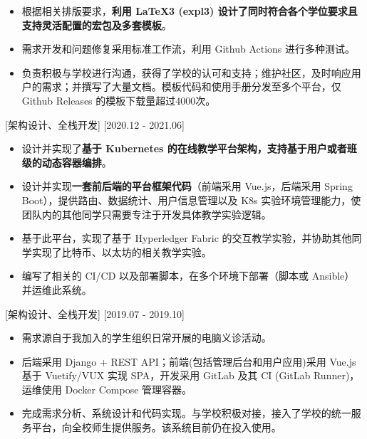 \documentclass{resume}
\begin{document}
\begin{itemize}
  \item 根据相关排版要求，\textbf{利用 LaTeX3 (expl3) 设计了同时符合各个学位要求且支持灵活配置的宏包及多套模板}。
  \item 需求开发和问题修复采用标准工作流，利用 Github Actions 进行多种测试。
  \item 负责积极与学校进行沟通，获得了学校的认可和支持；维护社区，及时响应用户的需求；并撰写了大量文档。模板代码和使用手册分发至多个平台，仅 Github Releases 的模板下载量超过4000次。
\end{itemize}


[架构设计、全栈开发]
[2020.12 - 2021.06] 

\begin{itemize}
  \item 设计并实现了\textbf{基于 Kubernetes 的在线教学平台架构，支持基于用户或者班级的动态容器编排}。
  \item 设计并实现\textbf{一套前后端的平台框架代码}（前端采用 Vue.js，后端采用 Spring Boot），提供路由、数据统计、用户信息管理以及 K8s 实验环境管理能力，使团队内的其他同学只需要专注于开发具体教学实验逻辑。
  \item 基于此平台，实现了基于 Hyperledger Fabric 的交互教学实验，并协助其他同学实现了比特币、以太坊的相关教学实验。
  \item 编写了相关的 CI/CD 以及部署脚本，在多个环境下部署（脚本或 Ansible）并运维此系统。
\end{itemize}

[架构设计、全栈开发]
[2019.07 - 2019.10] 

\begin{itemize}
  \item 需求源自于我加入的学生组织日常开展的电脑义诊活动。
  \item 后端采用 Django + REST API；前端(包括管理后台和用户应用)采用 Vue.js 基于 Vuetify/VUX 实现 SPA，开发采用 GitLab 及其 CI (GitLab Runner)，运维使用 Docker Compose 管理容器。
  \item 完成需求分析、系统设计和代码实现。与学校积极对接，接入了学校的统一服务平台，向全校师生提供服务。该系统目前仍在投入使用。
\end{itemize}
\end{document}
